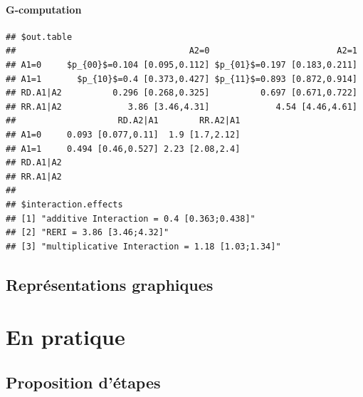 \documentclass[
]{book}
\begin{document}
\hypertarget{g-computation}{%
\subsection*{G-computation}\label{g-computation}}

\begin{verbatim}
## $out.table
##                                  A2=0                         A2=1
## A1=0     $p_{00}$=0.104 [0.095,0.112] $p_{01}$=0.197 [0.183,0.211]
## A1=1       $p_{10}$=0.4 [0.373,0.427] $p_{11}$=0.893 [0.872,0.914]
## RD.A1|A2          0.296 [0.268,0.325]          0.697 [0.671,0.722]
## RR.A1|A2             3.86 [3.46,4.31]             4.54 [4.46,4.61]
##                    RD.A2|A1        RR.A2|A1
## A1=0     0.093 [0.077,0.11]  1.9 [1.7,2.12]
## A1=1     0.494 [0.46,0.527] 2.23 [2.08,2.4]
## RD.A1|A2                                   
## RR.A1|A2                                   
## 
## $interaction.effects
## [1] "additive Interaction = 0.4 [0.363;0.438]"     
## [2] "RERI = 3.86 [3.46;4.32]"                      
## [3] "multiplicative Interaction = 1.18 [1.03;1.34]"
\end{verbatim}

\hypertarget{repruxe9sentations-graphiques}{%
\chapter{Représentations graphiques}\label{repruxe9sentations-graphiques}}

\hypertarget{part-en-pratique}{%
\part{En pratique}\label{part-en-pratique}}

\hypertarget{proposition-duxe9tapes}{%
\chapter{Proposition d'étapes}\label{proposition-duxe9tapes}}
\end{document}
